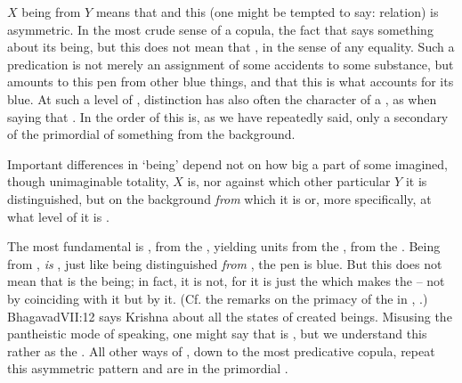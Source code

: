 $X$ being  from $Y$ means that  and this (one
might be tempted to say: relation) is asymmetric. In the most crude sense of a
copula, the fact that  says something about its being, but
this does not mean that , in the sense of any equality. 
Such a predication is not merely an assignment of some accidents to some
substance, but amounts to  this pen from other blue things,
and that this is what accounts for its  blue. At such a level of
, distinction has also often the character of a , as when saying that . In the order of
 this is, as we have repeatedly said, only a secondary 
of the primordial  of something from the background.  

\pa Important differences in `being' depend not on how big a part of some
imagined, though unimaginable totality, $X$ is, nor against which other
particular $Y$ it is distinguished, but on the background {\em from} which it is
 or, more specifically, at what level of
 it is . 

The most fundamental  is ,  from the
, yielding units from the ,  from the .
Being  from ,  {\em is} , just like
being distinguished {\em from} , the pen is blue.  But this does not
mean that  is the  being; in fact, it is not, for it is
just the  which makes the   -- not by
coinciding with it but by  it. (Cf. the remarks on the primacy
of the  in , .)  \citet{I am
  not in them; they are in Me.}{Bhagavad}{VII:12} says Krishna about all the
states of created beings.  Misusing the pantheistic mode of speaking, one might
say that  is  , but we understand this
 rather as the .  All other ways of
, down to the most  predicative copula, repeat this
asymmetric pattern and are  in the primordial
.


